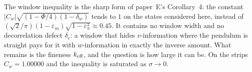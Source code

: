 The window inequality is the sharp form of paper~E's Corollary~4: the constant $|C_w|\sqrt{(1-\Phi/4)(1-\delta_w)}$ tends to $1$ on the
states considered here, instead of $(\sqrt2/\pi)(1-\varepsilon_m)\sqrt{1-\varepsilon_\pi^2}\approx0.45$. It contains no window width and no
decorrelation defect $\delta_c$: a window that hides $v$-information where the pendulum is straight pays for it with $w$-information in
exactly the inverse amount. What remains is the fineness $k_{\mathrm{eff}}$, and the question is how large it can be. On the strips
$C_w=1.00000$ and the inequality is saturated as $\sigma\to0$.

